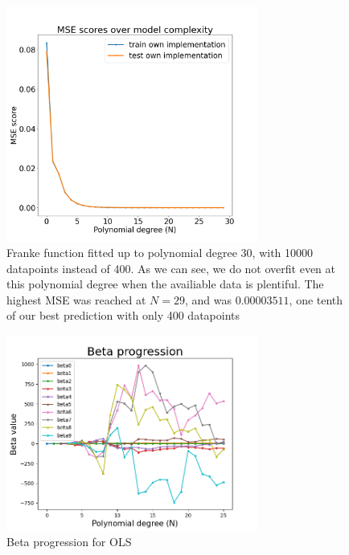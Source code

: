 \documentclass[twocolumn,10pt,cleanfoot]{asme2ej}
\begin{document}
\begin{figure}
\centerline{\includegraphics[width=3.25in]{figure/frankiehigherdatapoints.png}}
\caption{Franke function fitted up to polynomial degree 30, with 10000 datapoints instead of 400. As we can see, we do not overfit even at this polynomial degree when the availiable data is plentiful. The highest MSE was reached at $N=29$, and was $0.00003511$, one tenth of our best prediction with only 400 datapoints}
\label{frankiehigherdatapoints}
\end{figure}

\begin{figure}
\centerline{\includegraphics[width=3.25in]{figure/frankenoisybeta.png}}
\caption{Beta progression for OLS}
\label{frankenoisybeta}
\end{figure}
\end{document}
